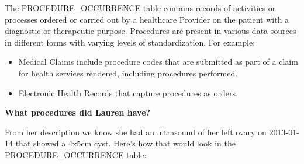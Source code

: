\documentclass[11pt]{book}
\providecommand{\tightlist}{%
  \setlength{\itemsep}{0pt}\setlength{\parskip}{0pt}}
\theoremstyle{definition}
\theoremstyle{definition}
\theoremstyle{definition}
\theoremstyle{remark}
\begin{document}
The PROCEDURE\_OCCURRENCE table contains records of activities or processes ordered or carried out by a healthcare Provider on the patient with a diagnostic or therapeutic purpose. Procedures are present in various data sources in different forms with varying levels of standardization. For example:

\begin{itemize}
\tightlist
\item
  Medical Claims include procedure codes that are submitted as part of a claim for health services rendered, including procedures performed.
\item
  Electronic Health Records that capture procedures as orders.
\end{itemize}

\textbf{What procedures did Lauren have?}

From her description we know she had an ultrasound of her left ovary on 2013-01-14 that showed a 4x5cm cyst. Here's how that would look in the PROCEDURE\_OCCURRENCE table:
\end{document}
